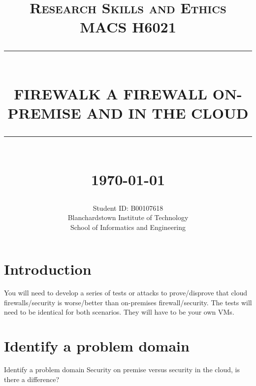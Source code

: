 \documentclass[12pt]{report}
\newcommand{\HRule}[1]{\rule{\linewidth}{#1}}
\begin{document}
\title{ \normalsize \textsc{Research Skills and Ethics MACS H6021}
		\\ [2.0cm]
		\HRule{0.5pt} \\
		\LARGE \textbf{\uppercase{Firewalk a Firewall On-Premise and in the Cloud}}
		\HRule{2pt} \\ [0.5cm]
		\normalsize \today \vspace*{5\baselineskip}}

\date{}

\author{
		Student ID: B00107618 \\ 
		Blanchardstown Institute of Technology \\
		School of Informatics and Engineering }

\maketitle
\tableofcontents
\newpage

\sectionfont{\scshape}


\section*{Introduction}
You will need to develop a series of tests or attacks to prove/disprove that cloud firewalls/security is
worse/better than on-premises firewall/security. The tests will need to be identical for both scenarios. 
\newline
They will have to be your own VMs.
\newline

\newpage
\section*{Identify a problem domain}
Identify a problem domain
\newline
Security on premise versus security in the cloud, is there a difference?
\newline
\end{document}
